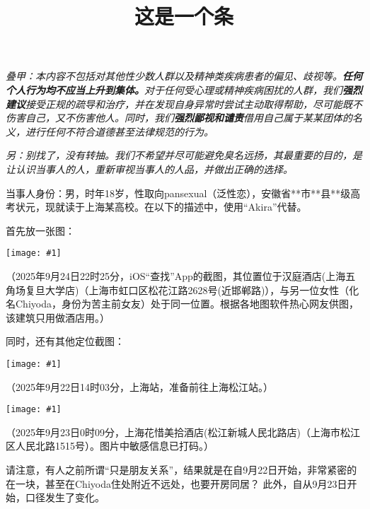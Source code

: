 \documentclass[12pt]{ctexart}
\title{这是一个\emoji{watermelon}条}
\date{}
\author{}
\begin{document}
\maketitle

	\thispagestyle{firstpager}

\newcommand{\CaseImage}[1]{
  \begin{center}
    \texttt{[image: \#1]}
  \end{center}
  \vspace{-0.8em}
}

\emph{叠甲：本内容不包括对其他性少数人群以及精神类疾病患者的偏见、歧视等。\textbf{任何个人行为均不应当上升到集体。}对于任何受心理或精神疾病困扰的人群，我们\textbf{强烈建议}接受正规的疏导和治疗，并在发现自身异常时尝试主动取得帮助，尽可能既不伤害自己，又不伤害他人。同时，我们\textbf{强烈鄙视和谴责}借用自己属于某某团体的名义，进行任何不符合道德甚至法律规范的行为。}

\emph{另：别找了，没有转抽。我们不希望并尽可能避免臭名远扬，其最重要的目的，是让认识当事人的人，重新审视当事人的人品，并做出正确的选择。}

当事人身份：男，时年18岁，性取向pansexual（泛性恋），安徽省**市**县**级高考状元，现就读于上海某高校。在以下的描述中，使用“Akira”代替。

首先放一张图：

\CaseImage{images/1.png}

（2025年9月24日22时25分，iOS“查找”App的截图，其位置位于汉庭酒店(上海五角场复旦大学店)（上海市虹口区松花江路2628号(近邯郸路)），与另一位女性（化名Chiyoda，身份为苦主前女友）处于同一位置。根据各地图软件热心网友供图，该建筑只用做酒店用。）

同时，还有其他定位截图：

\CaseImage{images/2.png}

（2025年9月22日14时03分，上海站，准备前往上海松江站。）

\CaseImage{images/3.png}

（2025年9月23日0时09分，上海花惜美拾酒店(松江新城人民北路店)（上海市松江区人民北路1515号）。图片中敏感信息已打码。）

请注意，有人之前所谓“只是朋友关系”，结果就是在自9月22日开始，非常紧密的在一块，甚至在Chiyoda住处附近不远处，也要开房同居？
此外，自从9月23日开始，口径发生了变化。
\end{document}
